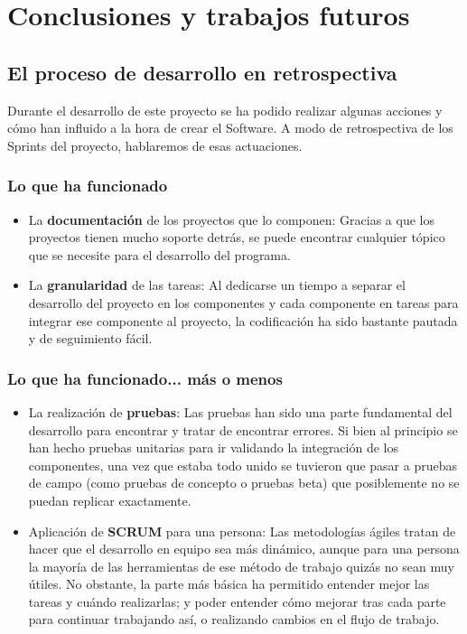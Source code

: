 \chapter{Conclusiones y trabajos futuros}

\noindent{}
\newline

\section{El proceso de desarrollo en retrospectiva}
Durante el desarrollo de este proyecto se ha podido realizar algunas acciones y cómo han influido a la hora de crear el Software. A modo de retrospectiva de los Sprints del proyecto, hablaremos de esas actuaciones.

\subsection{Lo que ha funcionado}
\begin{itemize}
	\item La \textbf{documentación} de los proyectos que lo componen: Gracias a que los proyectos tienen mucho soporte detrás, se puede encontrar cualquier tópico que se necesite para el desarrollo del programa.
	\item La \textbf{granularidad} de las tareas: Al dedicarse un tiempo a separar el desarrollo del proyecto en los componentes y cada componente en tareas para integrar ese componente al proyecto, la codificación ha sido bastante pautada y de seguimiento fácil.
\end{itemize}
\subsection{Lo que ha funcionado... más o menos}
\begin{itemize}
	\item La realización de \textbf{pruebas}: Las pruebas han sido una parte fundamental del desarrollo para encontrar y tratar de encontrar errores. Si bien al principio se han hecho pruebas unitarias para ir validando la integración de los componentes, una vez que estaba todo unido se tuvieron que pasar a pruebas de campo (como pruebas de concepto o pruebas beta) que posiblemente no se puedan replicar exactamente.
	\item Aplicación de \textbf{SCRUM} para una persona: Las metodologías ágiles tratan de hacer que el desarrollo en equipo sea más dinámico, aunque para una persona la mayoría de las herramientas de ese método de trabajo quizás no sean muy útiles. No obstante, la parte más básica ha permitido entender mejor las tareas y cuándo realizarlas; y poder entender cómo mejorar tras cada parte para continuar trabajando así, o realizando cambios en el flujo de trabajo.
\end{itemize}

